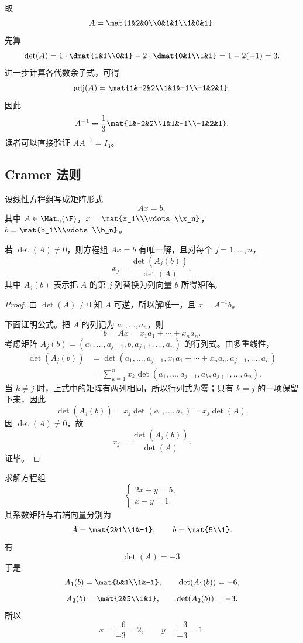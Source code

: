 \begin{example}
取
\[
A=\mat{1&2&0\\0&1&1\\1&0&1}.
\]
先算
\[
\det(A)=1\cdot\dmat{1&1\\0&1}-2\cdot\dmat{0&1\\1&1}=1-2(-1)=3.
\]
进一步计算各代数余子式，可得
\[
\operatorname{adj}(A)=\mat{1&-2&2\\1&1&-1\\-1&2&1}.
\]
因此
\[
A^{-1}=\frac13\mat{1&-2&2\\1&1&-1\\-1&2&1}.
\]
读者可以直接验证 $AA^{-1}=I_3$。
\end{example}

\subsection{Cramer 法则}

设线性方程组写成矩阵形式
\[
Ax=b,
\]
其中 $A\in\Mat_n(\F)$，$x=\mat{x_1\\\vdots\\x_n}$，$b=\mat{b_1\\\vdots\\b_n}$。

\begin{theorem}[Cramer 法则]
若 $\det(A)\ne 0$，则方程组 $Ax=b$ 有唯一解，且对每个 $j=1,\dots,n$，
\[
x_j=\frac{\det(A_j(b))}{\det(A)},
\]
其中 $A_j(b)$ 表示把 $A$ 的第 $j$ 列替换为列向量 $b$ 所得矩阵。
\end{theorem}

\begin{proof}
由 $\det(A)\ne 0$ 知 $A$ 可逆，所以解唯一，且 $x=A^{-1}b$。

下面证明公式。把 $A$ 的列记为 $a_1,\dots,a_n$，则
\[
b=Ax=x_1a_1+\cdots+x_na_n.
\]
考虑矩阵 $A_j(b)=(a_1,\dots,a_{j-1},b,a_{j+1},\dots,a_n)$ 的行列式。由多重线性，
\begin{align*}
\det(A_j(b))
&=\det(a_1,\dots,a_{j-1},x_1a_1+\cdots+x_na_n,a_{j+1},\dots,a_n)\\
&=\sum_{k=1}^n x_k\det(a_1,\dots,a_{j-1},a_k,a_{j+1},\dots,a_n).
\end{align*}
当 $k\ne j$ 时，上式中的矩阵有两列相同，所以行列式为零；只有 $k=j$ 的一项保留下来，因此
\[
\det(A_j(b))=x_j\det(a_1,\dots,a_n)=x_j\det(A).
\]
因 $\det(A)\ne 0$，故
\[
x_j=\frac{\det(A_j(b))}{\det(A)}.
\]
证毕。
\end{proof}

\begin{example}
求解方程组
\[
\begin{cases}
2x+y=5,\\
x-y=1.
\end{cases}
\]
其系数矩阵与右端向量分别为
\[
A=\mat{2&1\\1&-1},\qquad b=\mat{5\\1}.
\]
有
\[
\det(A)=-3.
\]
于是
\[
A_1(b)=\mat{5&1\\1&-1},\qquad \det(A_1(b))=-6,
\]
\[
A_2(b)=\mat{2&5\\1&1},\qquad \det(A_2(b))=-3.
\]
所以
\[
x=\frac{-6}{-3}=2,
\qquad
y=\frac{-3}{-3}=1.
\]
\end{example}

